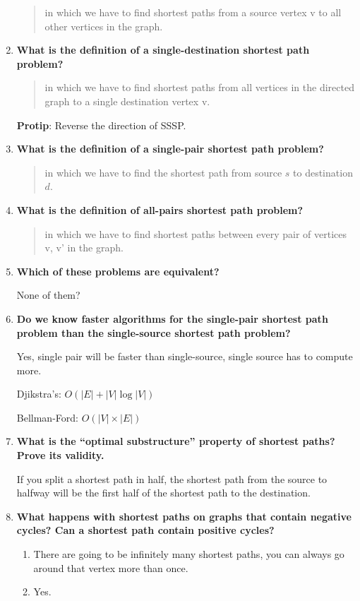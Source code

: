 \documentclass[a4paper,11pt]{article}
\begin{document}
\begin{enumerate}
  \begin{quote}
  in which we have to find shortest paths from a source vertex v to all
  other vertices in the graph.
  \end{quote}
\item
  \textbf{What is the definition of a single-destination shortest path
  problem?}

  \begin{quote}
  in which we have to find shortest paths from all vertices in the
  directed graph to a single destination vertex v.
  \end{quote}

  \textbf{Protip}: Reverse the direction of SSSP.
\item
  \textbf{What is the definition of a single-pair shortest path
  problem?}

  \begin{quote}
  in which we have to find the shortest path from source $s$ to
  destination $d$.
  \end{quote}
\item
  \textbf{What is the definition of all-pairs shortest path problem?}

  \begin{quote}
  in which we have to find shortest paths between every pair of vertices
  v, v' in the graph.
  \end{quote}
\item
  \textbf{Which of these problems are equivalent?}

  None of them?
\item
  \textbf{Do we know faster algorithms for the single-pair shortest path
  problem than the single-source shortest path problem?}

  Yes, single pair will be faster than single-source, single source has
  to compute more.

  Djikstra's: $O(|E| + |V| \log|V|)$

  Bellman-Ford: $O(|V| \times |E|)$
\item
  \textbf{What is the ``optimal substructure'' property of shortest
  paths? Prove its validity.}

  If you split a shortest path in half, the shortest path from the
  source to halfway will be the first half of the shortest path to the
  destination.
\item
  \textbf{What happens with shortest paths on graphs that contain
  negative cycles? Can a shortest path contain positive cycles?}

  \begin{enumerate}
  \def\labelenumii{\arabic{enumii}.}
  \itemsep1pt\parskip0pt
  \item
    There are going to be infinitely many shortest paths, you can always
    go around that vertex more than once.
  \item
    Yes.
  \end{enumerate}
\end{enumerate}
\end{document}
